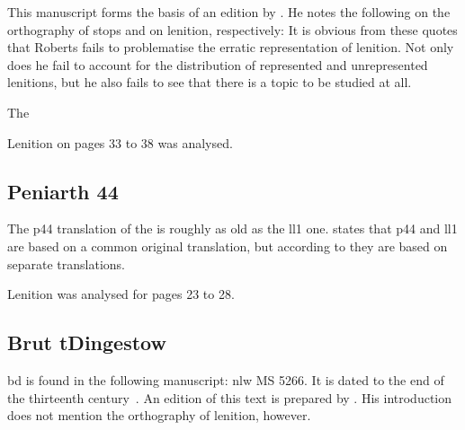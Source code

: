 This manuscript forms the basis of an edition
by \textcite{roberts_brut_1971}.  He notes the following on the
orthography of stops and on lenition, respectively:
It is obvious from these quotes that Roberts fails to problematise the
erratic representation of lenition.  Not only does he fail to account
for the distribution of represented and unrepresented lenitions, but
he also fails to see that there is a topic to be studied at all.

The 

Lenition on pages 33 to 38 was analysed.

\subsection{Peniarth 44}
The \gls{p44} translation of the  is roughly as old as the \gls{ll1} one.
\Textcite{lewis_brut_1942} states that \gls{p44} and \gls{ll1} are based on a common original translation,
but according to \textcite[xliii--xliv]{roberts_astudiaeth_1969}  they are based on separate translations.

Lenition was analysed for pages 23 to 28.
\subsection{Brut tDingestow}
\label{sec:dingestow}
\Gls{bd} is found in the following manuscript: \gls{nlw} MS 5266.  It
is dated to the end of the thirteenth century~\autocite[xliii]{roberts_astudiaeth_1969}.
An edition of this text is prepared by \textcite{lewis_brut_1942}.  His
introduction does not mention the orthography of lenition, however.

